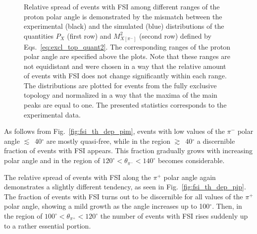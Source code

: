 \begin{figure}[!ht]
\begin{center}
\end{center}
\caption{\small Relative spread of events with FSI among different ranges of the proton polar angle is demonstrated by the mismatch between the experimental (black) and the simulated (blue) distributions of the quantities $P_{X}$ (first row) and $M^{2}_{X[\pi^{-}]}$ (second row) defined by Eqs.~\eqref{eq:excl_top_quant2}. The corresponding ranges of the proton polar angle are specified above the plots. Note that these ranges are not equidistant and were chosen in a way that the relative amount of events with FSI does not change significantly within each range. The distributions are plotted for events from the fully exclusive topology and normalized in a way that the maxima of the main peaks are equal to one. The presented statistics corresponds to the experimental data.}
\label{fig:fsi_th_dep_pr}
\end{figure}



As follows from Fig.~\ref{fig:fsi_th_dep_pim}, events with low values of the $\pi^{-}$ polar angle $\lesssim$~40$^{\circ}$ are mostly quasi-free, while in the region $\gtrsim$~40$^{\circ}$ a discernible fraction of events with FSI appears. This fraction gradually grows with increasing polar angle and in the region of $120^{\circ}<\theta_{\pi^{-}}<140^{\circ}$ becomes considerable. 

The relative spread of events with FSI along the $\pi^{+}$ polar angle again demonstrates a slightly different tendency, as seen in Fig.~\ref{fig:fsi_th_dep_pip}. The fraction of events with FSI turns out to be discernible for all values of the $\pi^{+}$ polar angle, showing a mild growth as the angle increases up to 100$^{\circ}$. Then, in the region of $100^{\circ}<\theta_{\pi^{+}}<120^{\circ}$ the number of events with FSI rises suddenly up to a rather essential portion.

